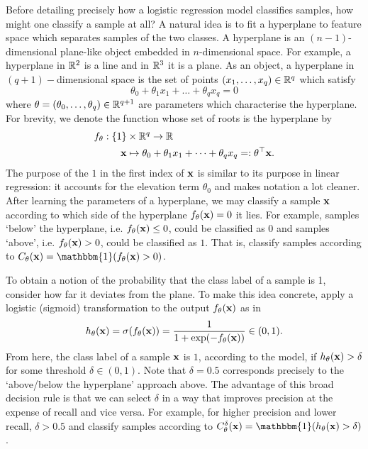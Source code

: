 \documentclass[11pt]{article}
\begin{document}
Before detailing precisely how a logistic regression model classifies samples, how might one classify a sample at all? A natural idea is to fit a hyperplane to feature space which separates samples of the two classes. A hyperplane is an $(n-1)$-dimensional plane-like object embedded in $n$-dimensional space. For example, a hyperplane in $\mathbb{R}^2$ is a line and in $\mathbb{R}^3$ it is a plane. As an object, a hyperplane in $(q+1)-$dimensional space is the set of points $(x_1,\dots,x_q)\in\mathbb{R}^q$ which satisfy %
$$
\theta_0+\theta_1x_1+\dots+\theta_qx_q
=
0
$$
where $\theta=(\theta_0,\dots,\theta_q)\in\mathbb{R}^{q+1}$ are parameters which characterise the hyperplane. For brevity, we denote the function whose set of roots is the hyperplane by
\begin{align*}
    f_{\theta}:\{1\}&\times\mathbb{R}^q\to\mathbb{R}\\
    \mathbf{x}&\mapsto \theta_0+\theta_1x_1+\dots+\theta_qx_q=:\theta^\top \mathbf{x}.
\end{align*}
The purpose of the $1$ in the first index of $\mathbf{x}$ is similar to its purpose in linear regression: it accounts for the elevation term $\theta_0$ and makes notation a lot cleaner. After learning the parameters of a hyperplane, we may classify a sample $\mathbf{x}$ according to which side of the hyperplane $f_{\theta}(\mathbf{x})=0$ it lies. For example, samples `below' the hyperplane, i.e. $f_{\theta}(\mathbf{x})\leq0$, could be classified as $0$ and samples `above', i.e. $f_{\theta}(\mathbf{x})>0$, could be classified as $1$. That is, classify samples according to $C_{\theta}(\x)=\mathbbm{1}(f_{\theta}(\x)>0)$.

To obtain a notion of the probability that the class label of a sample is 1, consider how far it deviates from the plane. To make this idea concrete, apply a logistic (sigmoid) transformation to the output $f_{\theta}(\mathbf{x})$ as in
$$
h_{\theta}(\mathbf{x})
=
\sigma(f_{\theta}(\mathbf{x}))
=
\frac{1}{1+\exp(-f_{\theta}(\mathbf{x}))}\in(0,1).
$$
From here, the class label of a sample $\mathbf{x}$ is $1$, according to the model, if $h_{\theta}(\mathbf{x})>\delta$ for some threshold $\delta\in(0,1)$. Note that $\delta=0.5$ corresponds precisely to the `above/below the hyperplane' approach above. The advantage of this broad decision rule is that we can select $\delta$ in a way that improves precision at the expense of recall and vice versa. For example, for higher precision and lower recall, $\delta>0.5$ and classify samples according to $C_{\theta}^{\delta}(\x)=\mathbbm{1}(h_{\theta}(\x)>\delta)$.
\end{document}
